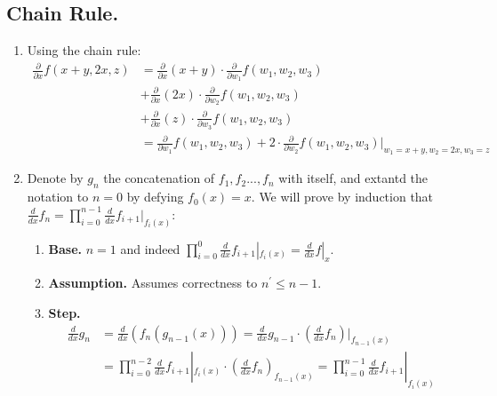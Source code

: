 \documentclass{article}
\begin{document}
\subsection{Chain Rule.}
\begin{enumerate}
    \item Using the chain rule: \begin{equation*}
    \begin{split}
        \frac{\partial}{\partial x} f(x+y, 2x, z) &= \frac{\partial}{\partial x} (x +y) \cdot \frac{\partial}{\partial w_{1}}  f(w_{1}, w_{2}, w_{3}) \\ & +  \frac{\partial}{\partial x} (2x) \cdot \frac{\partial}{\partial w_{2}}  f(w_{1}, w_{2}, w_{3}) \\ &+ \frac{\partial}{\partial x} (z) \cdot \frac{\partial}{\partial w_{3}}  f(w_{1}, w_{2}, w_{3})  \\ &
        =  \frac{\partial}{\partial w_{1}}  f(w_{1}, w_{2}, w_{3}) +   2 \cdot \frac{\partial}{\partial w_{2}}  f(w_{1}, w_{2}, w_{3}) |_{w_{1}=x+y,w_{2}=2x, w_{3} = z}
    \end{split}
\end{equation*}
\item Denote by $g_n$ the concatenation of $f_{1},f_{2}...,f_{n}$ with itself, and extantd the notation to $n=0$ by defying  $f_{0}(x) = x$. We will prove by induction that $\frac{d}{dx}f_{n} = \prod_{i=0}^{n-1}\frac{d}{dx}f_{i+1}|_{f_{i}(x)}$:
\begin{enumerate}
    \item \textbf{Base.} $n=1$ and indeed $\prod_{i=0}^{0}\frac{d}{dx}f_{i+1}|_{f_{i}(x)} = \frac{d}{dx}f|_x  $.
    \item \textbf{Assumption.} Assumes correctness to $n^\prime \le n-1$.
    \item \textbf{Step.} 
\begin{equation*}
    \begin{split}
      \frac{d}{ dx}  g_{n}  & = \frac{d}{ dx} \left( f_{n} \left( g_{n-1}(x) \right) \right) =\frac{d}{ dx} g_{n-1} \cdot \left( \frac{d}{d x} f_{n}  \right)|_{ f_{n-1}(x)} \\ 
      & = \prod_{i=0}^{n-2}\frac{d}{dx}f_{i+1}|_{f_{i}(x)} \cdot \left( \frac{d}{d x} f_{n}  \right)_{ f_{n-1}(x)} = \prod_{i=0}^{n-1}\frac{d}{dx}f_{i+1}|_{f_{i}(x)}
    \end{split}
\end{equation*}
\end{enumerate}





\end{enumerate}
\end{document}

